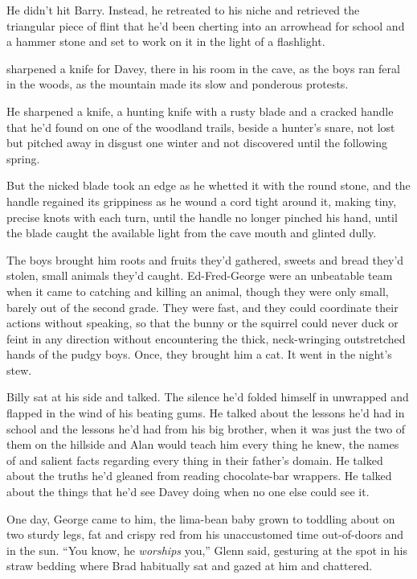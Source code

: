 He didn't hit Barry.  Instead, he retreated to his niche and retrieved
the triangular piece of flint that he'd been cherting into an
arrowhead for school and a hammer stone and set to work on it in the
light of a flashlight.

 sharpened a knife for Davey, there in his room in the cave, as the
boys ran feral in the woods, as the mountain made its slow and
ponderous protests.

He sharpened a knife, a hunting knife with a rusty blade and a cracked
handle that he'd found on one of the woodland trails, beside a
hunter's snare, not lost but pitched away in disgust one winter and
not discovered until the following spring.

But the nicked blade took an edge as he whetted it with the round
stone, and the handle regained its grippiness as he wound a cord tight
around it, making tiny, precise knots with each turn, until the handle
no longer pinched his hand, until the blade caught the available light
from the cave mouth and glinted dully.

The boys brought him roots and fruits they'd gathered, sweets and
bread they'd stolen, small animals they'd caught.  Ed-Fred-George were
an unbeatable team when it came to catching and killing an animal,
though they were only small, barely out of the second grade.  They
were fast, and they could coordinate their actions without speaking,
so that the bunny or the squirrel could never duck or feint in any
direction without encountering the thick, neck-wringing outstretched
hands of the pudgy boys.  Once, they brought him a cat.  It went in
the night's stew.

Billy sat at his side and talked.  The silence he'd folded himself in
unwrapped and flapped in the wind of his beating gums.  He talked
about the lessons he'd had in school and the lessons he'd had from his
big brother, when it was just the two of them on the hillside and Alan
would teach him every thing he knew, the names of and salient facts
regarding every thing in their father's domain.  He talked about the
truths he'd gleaned from reading chocolate-bar wrappers.  He talked
about the things that he'd see Davey doing when no one else could see
it.

One day, George came to him, the lima-bean baby grown to toddling
about on two sturdy legs, fat and crispy red from his unaccustomed
time out-of-doors and in the sun.  ``You know, he \textit{worships}
you,'' Glenn said, gesturing at the spot in his straw bedding where
Brad habitually sat and gazed at him and chattered.

